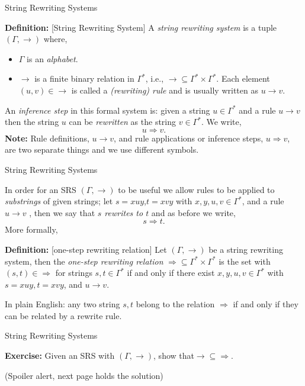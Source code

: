 \documentclass{beamer}
\begin{document}
\begin{frame}[fragile]{String Rewriting Systems}

\vspace{.1in}
{\bf Definition:} [String Rewriting System]  A {\em string rewriting system} is a tuple $(\Gamma,\rightarrow)$ where,
\begin{itemize}
\item $\Gamma$ is an {\em alphabet}. 
\item $\rightarrow$ is a finite binary relation in $\Gamma^*$, i.e., $\rightarrow\subseteq \Gamma^*\times\Gamma^*$. Each element  
$(u,v)\in \rightarrow$ is called a {\em (rewriting) rule} and is usually written as $u \rightarrow v$.
\end{itemize}

\vspace{.1in}
An {\em inference step} in this formal system is: given a string $u\in\Gamma^*$ and a rule $u \rightarrow v$ then the string $u$ can be {\em rewritten} as the string $v\in\Gamma^*$. We write,
\[
u \Rightarrow v.
\]
{\bf Note:} Rule definitions, $u\rightarrow v$, and rule applications or inference steps, $u\Rightarrow v$, are two separate things and
we use different symbols.
\end{frame}


\begin{frame}[fragile]{String Rewriting Systems}

\small
In order for an SRS $(\Gamma,\rightarrow)$ to be useful we allow rules to be applied to {\em substrings} of given strings; let $s = xuy$,$t=xvy$ with $x,y,u,v \in \Gamma^*$, and a rule $u\rightarrow v$ , then we say that {\em $s$ rewrites to $t$} and as before we write,
\[
s \Rightarrow t.
\]
More formally,

\vspace{.1in}
{\bf Definition:} [one-step rewriting relation] Let $(\Gamma,\rightarrow)$ be a string rewriting system,
then the {\em one-step rewriting relation} $\Rightarrow\subseteq \Gamma^*\times\Gamma^*$ is  the set with $(s,t) \in \Rightarrow$ for strings $s,t \in\Gamma^*$
 if and only if there exist $x, y, u, v \in\Gamma^*$ with $s = xuy, t = xvy$, and $u\rightarrow v $.

\vspace{.1in}
In plain English: any two string $s,t$ belong to the relation $\Rightarrow$ if and only if they can be related by 
a rewrite rule.
\end{frame}

\begin{frame}[fragile]{String Rewriting Systems}

{\bf Exercise:} Given an SRS with $(\Gamma, \rightarrow)$, show that$\rightarrow \subseteq \Rightarrow$.

\vspace{2in}
(Spoiler alert, next page holds the solution)
\end{frame}
\end{document}

